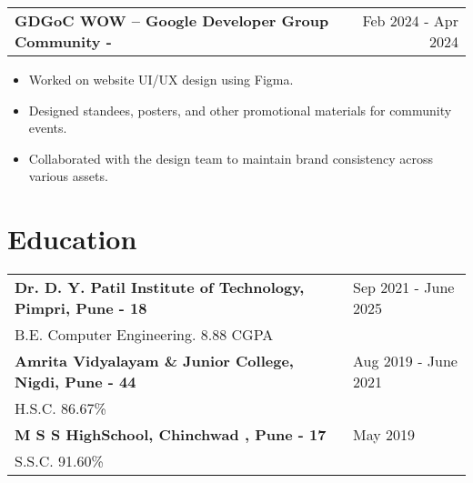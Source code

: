 \documentclass[a4paper,10pt]{article}
\makeatletter
\newenvironment{joblong}[2]
    {
    \begin{tabularx}{\linewidth}{@{}l X r@{}}
    \textbf{#1} & \hfill &  #2 \\[3.75pt]
    \end{tabularx}
    \begin{minipage}[t]{\linewidth}
    \begin{itemize}[nosep,after=\strut, leftmargin=1em, itemsep=3pt,label=--]
    }
    {
    \end{itemize}
    \end{minipage}    
    }
\makeatother
\begin{document}
    \begin{joblong}{GDGoC WOW – Google Developer Group Community - \normalfont{\textit{Design Team Member}}}{Feb 2024 - Apr 2024}
        \item Worked on website UI/UX design using Figma.
        \item Designed standees, posters, and other promotional materials for community events.
        \item Collaborated with the design team to maintain brand consistency across various assets.
    \end{joblong}

\section{Education}
\begin{tabularx}{\linewidth}{@{}l X@{}}	


    \textbf{Dr. D. Y. Patil Institute of Technology, Pimpri, Pune - 18} & \hfill Sep 2021 - June 2025 \\ \vspace*{2mm}
    B.E. Computer Engineering. 8.88 CGPA \\ 
    
    \textbf{Amrita Vidyalayam \& Junior College, Nigdi, Pune - 44} & \hfill Aug 2019 - June 2021 \\ \vspace*{2mm}
    H.S.C. 86.67\% \\ 
    
    \textbf{M S S HighSchool, Chinchwad , Pune - 17} & \hfill May 2019 \\ \vspace*{2mm}
    S.S.C. 91.60\% \\

\end{tabularx}
\end{document}
